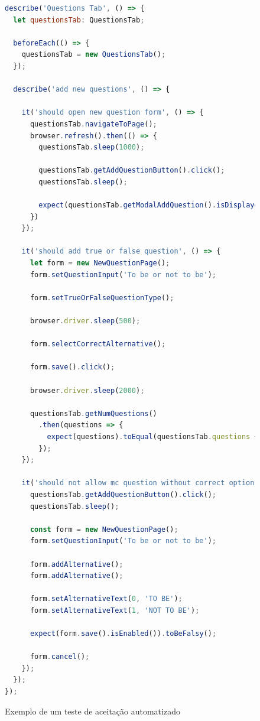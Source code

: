 \begin{figure}[!ht]
  \caption{Exemplo de um teste de aceitação automatizado}
  \label{fig:testes_automatizados}
  \begin{lstlisting}[language=JavaScript]
describe('Questions Tab', () => {
  let questionsTab: QuestionsTab;

  beforeEach(() => {
    questionsTab = new QuestionsTab();
  });

  describe('add new questions', () => {

    it('should open new question form', () => {
      questionsTab.navigateToPage();
      browser.refresh().then(() => {
        questionsTab.sleep(1000);

        questionsTab.getAddQuestionButton().click();
        questionsTab.sleep();

        expect(questionsTab.getModalAddQuestion().isDisplayed()).toBeTruthy();
      })
    });

    it('should add true or false question', () => {
      let form = new NewQuestionPage();
      form.setQuestionInput('To be or not to be');

      form.setTrueOrFalseQuestionType();

      browser.driver.sleep(500);

      form.selectCorrectAlternative();

      form.save().click();

      browser.driver.sleep(2000);

      questionsTab.getNumQuestions()
        .then(questions => {
          expect(questions).toEqual(questionsTab.questions + 1);
        });
    });

    it('should not allow mc question without correct option', () => {
      questionsTab.getAddQuestionButton().click();
      questionsTab.sleep();

      const form = new NewQuestionPage();
      form.setQuestionInput('To be or not to be');

      form.addAlternative();
      form.addAlternative();

      form.setAlternativeText(0, 'TO BE');
      form.setAlternativeText(1, 'NOT TO BE');

      expect(form.save().isEnabled()).toBeFalsy();

      form.cancel();
    });
  });
});
\end{lstlisting}
\doautor
\end{figure}
